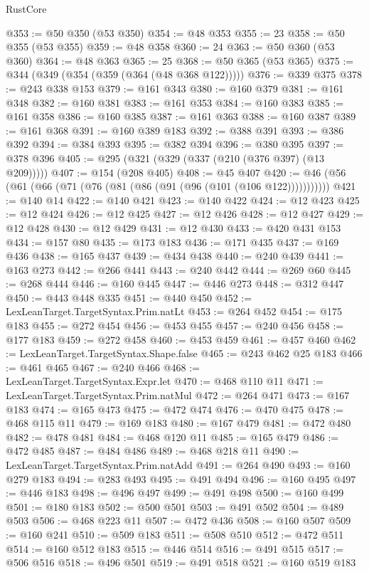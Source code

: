 \begin{lexlean}{RustCore}
\begin{coremodule}
@353 := @50 @350 (@53 @350)
@354 := @48 @353
@355 := 23
@358 := @50 @355 (@53 @355)
@359 := @48 @358
@360 := 24
@363 := @50 @360 (@53 @360)
@364 := @48 @363
@365 := 25
@368 := @50 @365 (@53 @365)
@375 := @344 (@349 (@354 (@359 (@364 (@48 @368 @122)))))
@376 := @339 @375
@378 := @243 @338 @153
@379 := @161 @343
@380 := @160 @379
@381 := @161 @348
@382 := @160 @381
@383 := @161 @353
@384 := @160 @383
@385 := @161 @358
@386 := @160 @385
@387 := @161 @363
@388 := @160 @387
@389 := @161 @368
@391 := @160 @389 @183
@392 := @388 @391
@393 := @386 @392
@394 := @384 @393
@395 := @382 @394
@396 := @380 @395
@397 := @378 @396
@405 := @295 (@321 (@329 (@337 (@210 (@376 @397) (@13 @209)))))
@407 := @154 (@208 @405)
@408 := @45 @407
@420 := @46 (@56 (@61 (@66 (@71 (@76 (@81 (@86 (@91 (@96 (@101 (@106 @122)))))))))))
@421 := @140 @14
@422 := @140 @421
@423 := @140 @422
@424 := @12 @423
@425 := @12 @424
@426 := @12 @425
@427 := @12 @426
@428 := @12 @427
@429 := @12 @428
@430 := @12 @429
@431 := @12 @430
@433 := @420 @431 @153
@434 := @157 @80
@435 := @173 @183
@436 := @171 @435
@437 := @169 @436
@438 := @165 @437
@439 := @434 @438
@440 := @240 @439
@441 := @163 @273
@442 := @266 @441
@443 := @240 @442
@444 := @269 @60
@445 := @268 @444
@446 := @160 @445
@447 := @446 @273
@448 := @312 @447
@450 := @443 @448 @335
@451 := @440 @450
@452 := LexLeanTarget.TargetSyntax.Prim.natLt
@453 := @264 @452
@454 := @175 @183
@455 := @272 @454
@456 := @453 @455
@457 := @240 @456
@458 := @177 @183
@459 := @272 @458
@460 := @453 @459
@461 := @457 @460
@462 := LexLeanTarget.TargetSyntax.Shape.false
@465 := @243 @462 @25 @183
@466 := @461 @465
@467 := @240 @466
@468 := LexLeanTarget.TargetSyntax.Expr.let
@470 := @468 @110 @11
@471 := LexLeanTarget.TargetSyntax.Prim.natMul
@472 := @264 @471
@473 := @167 @183
@474 := @165 @473
@475 := @472 @474
@476 := @470 @475
@478 := @468 @115 @11
@479 := @169 @183
@480 := @167 @479
@481 := @472 @480
@482 := @478 @481
@484 := @468 @120 @11
@485 := @165 @479
@486 := @472 @485
@487 := @484 @486
@489 := @468 @218 @11
@490 := LexLeanTarget.TargetSyntax.Prim.natAdd
@491 := @264 @490
@493 := @160 @279 @183
@494 := @283 @493
@495 := @491 @494
@496 := @160 @495
@497 := @446 @183
@498 := @496 @497
@499 := @491 @498
@500 := @160 @499
@501 := @180 @183
@502 := @500 @501
@503 := @491 @502
@504 := @489 @503
@506 := @468 @223 @11
@507 := @472 @436
@508 := @160 @507
@509 := @160 @241
@510 := @509 @183
@511 := @508 @510
@512 := @472 @511
@514 := @160 @512 @183
@515 := @446 @514
@516 := @491 @515
@517 := @506 @516
@518 := @496 @501
@519 := @491 @518
@521 := @160 @519 @183

\end{coremodule}
\end{lexlean}

